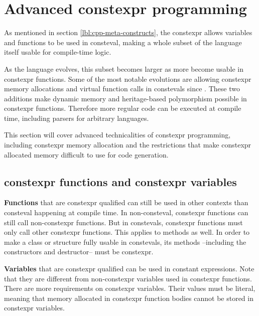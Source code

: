 \documentclass[../main]{subfiles}
\begin{document}
\section{
  Advanced constexpr programming
}
\label{lbl:constexpr-programming}


As mentioned in section \ref{lbl:cpp-meta-constructs}, the \gls{constexpr}
allows variables and functions to be used in \gls{consteval},
making a whole subset of the \cpp language itself usable for compile-time logic.

As the language evolves, this subset becomes larger as more \cpp become
usable in \gls{constexpr} functions. Some of the most notable evolutions
are allowing \gls{constexpr} memory allocations and virtual function calls
in \glspl{consteval} since .
These two additions make dynamic memory and heritage-based polymorphism
possible in \gls{constexpr} functions. Therefore more regular \cpp code can be
executed at compile time, including parsers for arbitrary languages.

This section will cover advanced technicalities of \gls{constexpr} programming,
including \gls{constexpr} memory allocation and the restrictions that make
\gls{constexpr} allocated memory difficult to use for \cpp code generation.

\clearpage%

\subsection{
  \gls{constexpr} functions and \gls{constexpr} variables
}

\textbf{Functions} that are \gls{constexpr} qualified can still be used
in other contexts than \gls{consteval} happening at compile time.
In non-\gls{consteval}, \gls{constexpr} functions can still call
non-\gls{constexpr} functions. But in \glspl{consteval}, \gls{constexpr}
functions must only call other \gls{constexpr} functions.
This applies to methods as well. In order to make a \cpp class or structure
fully usable in \glspl{consteval}, its methods --including the constructors
and destructor-- must be \gls{constexpr}.

\textbf{Variables} that are \gls{constexpr} qualified can be
used in constant expressions. Note that they are different from
non-\gls{constexpr} variables used in \gls{constexpr} functions.
There are more requirements on \gls{constexpr} variables.
Their values must be literal, meaning that memory allocated in \gls{constexpr}
function bodies cannot be stored in \gls{constexpr} variables.
\end{document}
